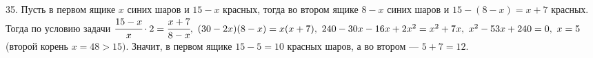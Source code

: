 35. Пусть в первом ящике $x$ синих шаров и $15-x$ красных, тогда во втором ящике $8-x$ синих шаров и $15-(8-x)=x+7$ красных. Тогда по условию задачи $\cfrac{15-x}{x}\cdot2=\cfrac{x+7}{8-x},\ (30-2x)(8-x)=x(x+7),\ 240-30x-16x+2x^2=x^2+7x,\ x^2-53x+240=0,\ x=5$ (второй корень $x=48>15).$ Значит, в первом ящике $15-5=10$ красных шаров, а во втором --- $5+7=12.$\\
